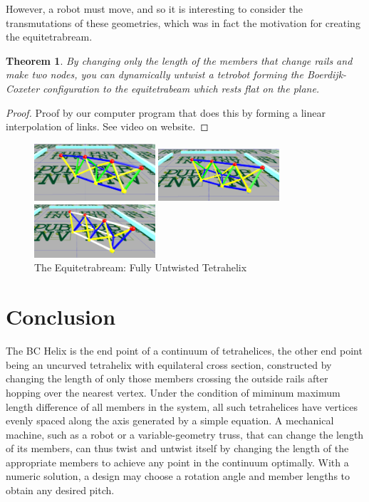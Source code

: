 \documentclass[11pt]{article}
\newtheorem{theorem}{Theorem}
\begin{document}
However, a robot must move, and so it is interesting to consider the
transmutations of these geometries, which was in fact the motivation
for creating the equitetrabream.

\begin{theorem}
  By changing only the length of the members that change rails and make two nodes, you can dynamically untwist a tetrobot
  forming the Boerdijk-Coxeter configuration to the equitetrabeam which rests flat on the plane.
\end{theorem}

\begin{proof}
  Proof by our computer program that does this by forming a linear interpolation of links.
  See video on website\cite{readtetrahelix}.
\end{proof}

\begin{figure}[H] %
  \centering
     \includegraphics[width=0.4\textwidth]{figures/Tetrahelix1.png}
     \caption{2/3rd Twisted Tetrahelix}
     \includegraphics[width=0.4\textwidth]{figures/Tetrahelix2.png}
     \caption{1/3rd Twisted, 2/3rd Untwisted Tetrahelix}
     \includegraphics[width=0.4\textwidth]{figures/Tetrahelix3.png}
     \caption{The Equitetrabream: Fully Untwisted Tetrahelix}
\end{figure}

\section{Conclusion}

The BC Helix is the end point of a continuum of tetrahelices, the
other end point being an uncurved tetrahelix with equilateral cross
section, constructed by changing the length of only those members
crossing the outside rails after hopping over the nearest
vertex. Under the condition of miminum maximum length difference of
all members in the system, all such tetrahelices have vertices evenly
spaced along the axis generated by a simple equation.  A mechanical
machine, such as a robot or a variable-geometry truss, that can change
the length of its members, can thus twist and untwist itself by
changing the length of the appropriate members to achieve any point in
the continuum optimally. With a numeric solution, a design may choose
a rotation angle and member lengths to obtain any desired pitch.
\end{document}
